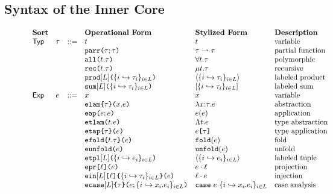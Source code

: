 \subsection{Syntax of the Inner Core}\label{sec:U-expanded-terms}

\begin{figure}
\hspace{-5px}$\begin{array}{lllllll}
\textbf{Sort} & & & \textbf{Operational Form} & \textbf{Stylized Form} & \textbf{Description}\\
\mathsf{Typ} & \tau & ::= & t & t & \text{variable}\\
&&& \texttt{parr}\texttt{(}\tau; \tau\texttt{)} & \tau \rightharpoonup \tau & \text{partial function}\\
&&& \texttt{all}\texttt{(}t.\tau\texttt{)} & \forall t.\tau & \text{polymorphic}\\
&&& \texttt{rec}\texttt{(}t.\tau\texttt{)} & \mu t.\tau & \text{recursive}\\
&&& \texttt{prod}[L]\texttt{(}\{i \hookrightarrow \tau_{i}\}_{i \in L}\texttt{)} & \langle \{i \hookrightarrow \tau_{i}\}_{i \in L} \rangle & \text{labeled product}\\
&&& \texttt{sum}[L]\texttt{(}\{i \hookrightarrow \tau_{i}\}_{i \in L}\texttt{)} & [\{i \hookrightarrow \tau_{i}\}_{i \in L}] & \text{labeled sum}\\
\mathsf{Exp} & e & ::= & x & x & \text{variable}\\
&&& \texttt{elam}\texttt{\{}\tau\texttt{\}(}x.e\texttt{)} & \lambda x{:}\tau.e & \text{abstraction}\\
&&& \texttt{eap}\texttt{(}e; e\texttt{)} & e(e) & \text{application}\\
&&& \texttt{etlam}\texttt{(}t.e\texttt{)} & \Lambda t.e & \text{type abstraction}\\
&&& \texttt{etap}\texttt{\{}\tau\texttt{\}(}e\texttt{)} & e\texttt{[}\tau\texttt{]} & \text{type application}\\
&&& \texttt{efold}\texttt{\{}t.\tau\texttt{\}(}e\texttt{)} & \texttt{fold}(e) & \text{fold}\\
&&& \texttt{eunfold}\texttt{(}e\texttt{)} & \texttt{unfold}(e) & \text{unfold}\\
&&& \texttt{etpl}[L]\texttt{(}\{i \hookrightarrow e_{i}\}_{i \in L}\texttt{)} & \langle \{i \hookrightarrow e_{i}\}_{i \in L}\rangle & \text{labeled tuple}\\
&&& \texttt{epr}\texttt{[}\ell\texttt{](}e\texttt{)} & e \cdot \ell & \text{projection}\\
&&& \texttt{ein}[L]\texttt{[}\ell\texttt{]\{}\{i \hookrightarrow \tau_{i}\}_{i \in L}\texttt{\}(}e\texttt{)} & \ell \cdot e & \text{injection}\\
&&& \texttt{ecase}[L]\texttt{\{}\tau\texttt{\}(}e; \{i \hookrightarrow x_{i}.e_{i}\}_{i \in L}\texttt{)} & \texttt{case}~e~\{i \hookrightarrow x_{i}.e_{i}\}_{i \in L} & \text{case analysis}
\end{array}$

\end{figure}
